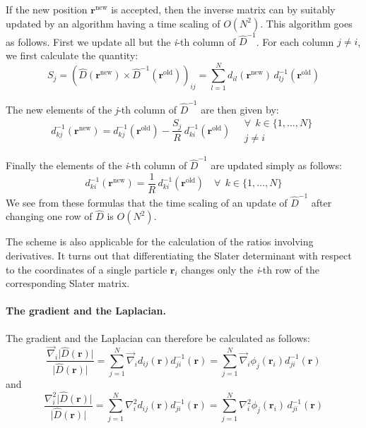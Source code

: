 \documentclass[%
oneside,                 %
final,                   %
10pt]{article}
\begin{document}
If the new position $\mathbf{r}^{\mathrm{new}}$ is accepted, then the
inverse matrix can by suitably updated by an algorithm having a time
scaling of $O(N^2)$.  This algorithm goes as
follows. First we update all but the \emph{i}-th column of $\hat{D}^{-1}$. For each column $j\neq i$, we first calculate the quantity:
\begin{equation}
S_j =
(\hat{D}(\mathbf{r}^{\mathrm{new}})\times
\hat{D}^{-1}(\mathbf{r}^{\mathrm{old}}))_{ij} =
\sum_{l=1}^N d_{il}(\mathbf{r}^{\mathrm{new}})\,
d^{-1}_{lj}(\mathbf{r}^{\mathrm{old}})
\label{eq:inverse_update_1}
\end{equation}

The new elements of the \emph{j}-th column of $\hat{D}^{-1}$ are then given
by:
\begin{equation}
d_{kj}^{-1}(\mathbf{r}^{\mathrm{new}}) =
d_{kj}^{-1}(\mathbf{r}^{\mathrm{old}}) -
\frac{S_j}{R}\,d_{ki}^{-1}(\mathbf{r}^{\mathrm{old}})\quad
\begin{array}{ll}
\forall\ \ k\in\{1,\dots,N\}\\j\neq i
\end{array}
\label{eq:inverse_update_2}
\end{equation}

Finally the elements of the \emph{i}-th column of $\hat{D}^{-1}$ are updated
simply as follows:
\begin{equation}
d_{ki}^{-1}(\mathbf{r}^{\mathrm{new}}) =
\frac{1}{R}\,d_{ki}^{-1}(\mathbf{r}^{\mathrm{old}})\quad
\forall\ \ k\in\{1,\dots,N\}
\label{eq:inverse_update_3}
\end{equation}
We see from these formulas that the time scaling of an update of
$\hat{D}^{-1}$ after changing one row of $\hat{D}$ is $O(N^2)$.

The scheme is also applicable for the calculation of the ratios
involving derivatives. It turns
out that differentiating the Slater determinant with respect
to the coordinates of a single particle  $\mathbf{r}_i$ changes only the
\emph{i}-th row of the corresponding Slater matrix. 

\paragraph{The gradient and the Laplacian.}
The gradient and the Laplacian can therefore be calculated as follows:
\[
\frac{\vec\nabla_i\vert\hat{D}(\mathbf{r})\vert}{\vert\hat{D}(\mathbf{r})\vert} =
\sum_{j=1}^N \vec\nabla_i d_{ij}(\mathbf{r})d_{ji}^{-1}(\mathbf{r}) =
\sum_{j=1}^N \vec\nabla_i \phi_j(\mathbf{r}_i)d_{ji}^{-1}(\mathbf{r})
\]
and
\[
\frac{\nabla^2_i\vert\hat{D}(\mathbf{r})\vert}{\vert\hat{D}(\mathbf{r})\vert} =
\sum_{j=1}^N \nabla^2_i d_{ij}(\mathbf{r})d_{ji}^{-1}(\mathbf{r}) =
\sum_{j=1}^N \nabla^2_i \phi_j(\mathbf{r}_i)\,d_{ji}^{-1}(\mathbf{r})
\]
\end{document}
